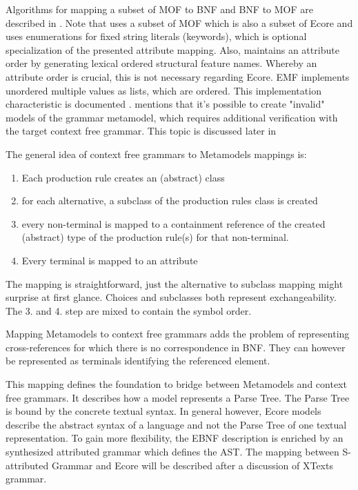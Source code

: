 Algorithms for mapping a subset of MOF to BNF and BNF to MOF are described in \cite{MofCfg}. Note that \cite{MofCfg} uses a subset of MOF which is also a subset of Ecore and uses enumerations for fixed string literals (keywords), which is optional specialization of the presented attribute mapping. Also,  \cite{MofCfg} maintains an attribute order by generating lexical ordered structural feature names. Whereby an attribute order is crucial, this is not necessary regarding Ecore. EMF implements unordered multiple values as lists, which are ordered. This implementation characteristic is documented \cite{EMF2nd}.  \cite{MofCfg} mentions that it's possible to create "invalid" models of the grammar metamodel, which requires additional verification with the target context free grammar. This topic is discussed later in 

The general idea of context free grammars to Metamodels mappings is:
\begin{enumerate}
	\item Each production rule creates an (abstract) class
	\item for each alternative,  a subclass of the production rules class is created
	\item every non-terminal is mapped to a containment reference of the created (abstract) type of the production rule(s) for that non-terminal.
	\item Every terminal is mapped to an attribute
\end{enumerate}

The mapping is straightforward, just the alternative to subclass mapping might surprise at first glance. Choices and subclasses both represent exchangeability. The 3. and 4. step are mixed to contain the symbol order.

Mapping Metamodels to context free grammars adds the problem of representing cross-references for which there is no correspondence in BNF. They can however be represented as terminals identifying the referenced element.   

This mapping defines the foundation to bridge between Metamodels and context free grammars. It describes how a model represents a Parse Tree. The Parse Tree is bound by the concrete textual syntax. In general however, Ecore models describe the abstract syntax of a language and not the Parse Tree of one textual representation. To gain more flexibility, the EBNF description is enriched by an synthesized attributed grammar which defines the AST. The mapping between S-attributed Grammar and Ecore will be described after a discussion of XTexts grammar.

